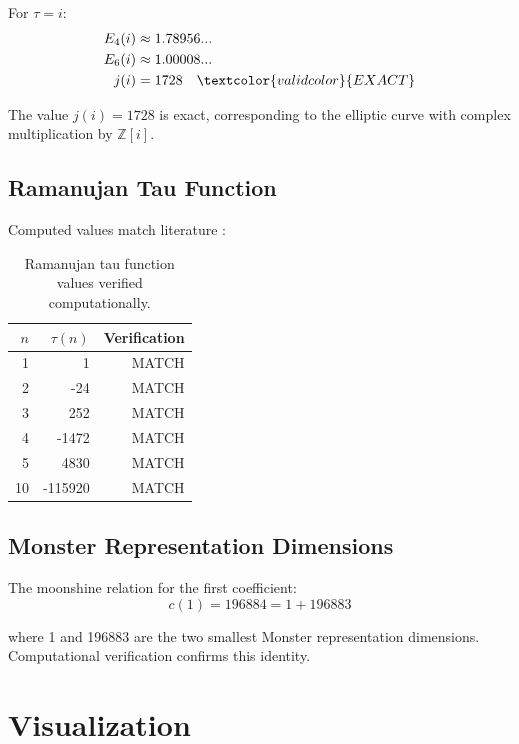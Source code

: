 For $\tau = i$:
\begin{align}
    E_4(i) &\approx 1.78956... \\
    E_6(i) &\approx 1.00008... \\
    j(i) &= 1728 \quad \textcolor{validcolor}{EXACT}
\end{align}

The value $j(i) = 1728$ is exact, corresponding to the elliptic curve with complex multiplication by $\mathbb{Z}[i]$.

\subsection{Ramanujan Tau Function}

Computed values match literature \cite{ramanujan1916certain}:

\begin{table}[h]
\centering
\begin{tabular}{rrr}
\toprule
$n$ & $\tau(n)$ & Verification \\
\midrule
1 & 1 & \textcolor{validcolor}{MATCH} \\
2 & -24 & \textcolor{validcolor}{MATCH} \\
3 & 252 & \textcolor{validcolor}{MATCH} \\
4 & -1472 & \textcolor{validcolor}{MATCH} \\
5 & 4830 & \textcolor{validcolor}{MATCH} \\
10 & -115920 & \textcolor{validcolor}{MATCH} \\
\bottomrule
\end{tabular}
\caption{Ramanujan tau function values verified computationally.}
\label{tab:ramanujan_tau}
\end{table}

\subsection{Monster Representation Dimensions}

The moonshine relation for the first coefficient:
\begin{equation}
    c(1) = 196884 = 1 + 196883
\end{equation}

where 1 and 196883 are the two smallest Monster representation dimensions. Computational verification confirms this identity.

\section{Visualization}

